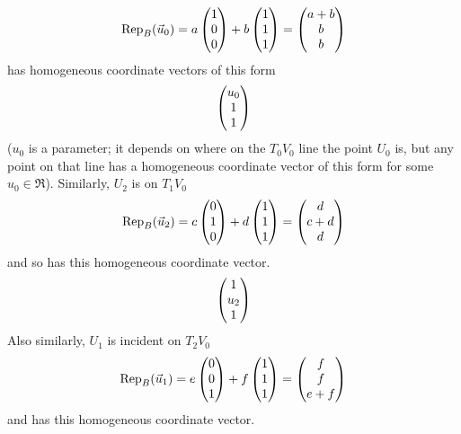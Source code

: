 \begin{exercises}
\begin{answer}
\begin{exparts}
          \begin{equation*}
            \rep{\vec{u}_0}{B}=a\colvec{1 \\ 0 \\ 0}
                               +b\colvec{1 \\ 1 \\ 1}
                              =\colvec{a+b \\ b \\ b}
          \end{equation*}
          has homogeneous coordinate vectors of this form
          \begin{equation*}
            \colvec{u_0 \\ 1 \\ 1}      
          \end{equation*}
          ($u_0$ is a parameter; it depends on where on the $T_0V_0$ line 
          the point $U_0$ is, but any point on that line has
          a homogeneous coordinate vector of this form for some $u_0\in\Re$).
          Similarly, $U_2$ is on $T_1V_0$
          \begin{equation*}
            \rep{\vec{u}_2}{B}=c\colvec{0 \\ 1 \\ 0}
                                +d\colvec{1 \\ 1 \\ 1}
                              =\colvec{d \\ c+d \\ d}
          \end{equation*}
          and so has this homogeneous coordinate vector.
          \begin{equation*}
            \colvec{1 \\ u_2 \\ 1}
          \end{equation*}
          Also similarly, $U_1$ is incident on $T_2V_0$
          \begin{equation*}
            \rep{\vec{u}_1}{B}=e\colvec{0 \\ 0 \\ 1}
                                +f\colvec{1 \\ 1 \\ 1}
                              =\colvec{f \\ f \\ e+f}  
          \end{equation*}
          and has this homogeneous coordinate vector.
          \begin{equation*}

\end{equation*}
\end{exparts}
\end{answer}
\end{exercises}
